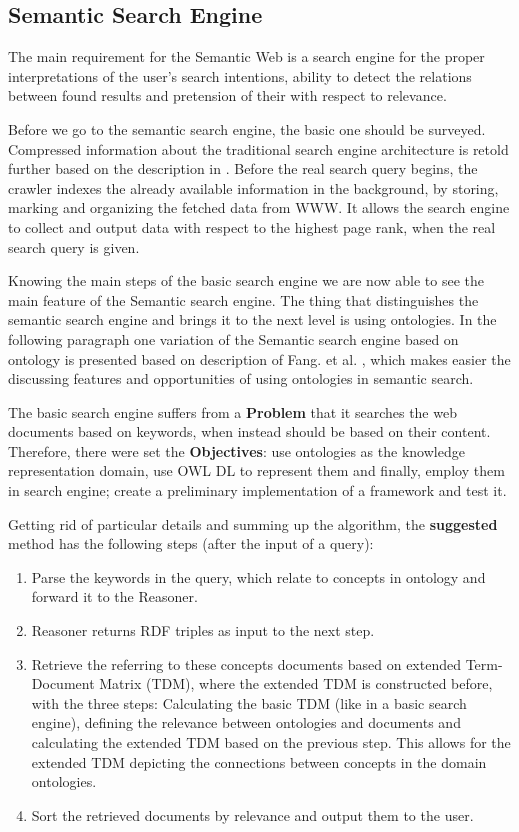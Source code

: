 		
		\subsection{Semantic Search Engine}
		The main requirement for the Semantic Web is a search engine for the proper interpretations of the user's search intentions, ability to detect the relations between found results and pretension of their with respect to relevance.
		
		Before we go to the semantic search engine, the basic one should be surveyed. Compressed information about the traditional search engine architecture is retold further based on the description in \cite{Gup12}. Before the real search query begins, the crawler indexes the already available information in the background, by  storing, marking and organizing the fetched data from WWW. It allows the search engine to collect and output data with respect to the highest page rank, when the real search query is given.
		
		Knowing the main steps of the basic search engine we are now able to see the main feature of the Semantic search engine. The thing that distinguishes the semantic search engine and brings it to the next level is using ontologies. In the following paragraph one variation of the Semantic search engine based on ontology is presented based on description of Fang. et al. \cite{Fang05}, which makes easier the discussing features and opportunities of using ontologies in semantic search.
		        
		The basic search engine suffers from a \textbf{Problem} that it searches the web documents based on keywords, when instead should be based on their content. Therefore, there were set the \textbf{Objectives}: use ontologies as the knowledge representation domain, use OWL DL to represent them and finally, employ them in search engine; create a preliminary implementation of a framework and test it. 
		
		Getting rid of particular details and summing up the algorithm, the \textbf{suggested} method has the following steps (after the input of a query):
			\begin{enumerate}
				\item Parse the keywords in the query, which relate to concepts in ontology and forward it to the Reasoner.
				\item Reasoner returns RDF triples as input to the next step.
				\item Retrieve the referring to these concepts documents based on extended Term-Document Matrix (TDM), where the extended TDM is constructed before, with the three steps: Calculating the basic TDM (like in a basic search engine), defining the relevance between ontologies and documents and calculating the extended TDM based on the previous step. This allows for the extended TDM depicting the connections between concepts in the domain ontologies.
				\item Sort the retrieved documents by relevance and output them to the user.   
			\end{enumerate}
		
